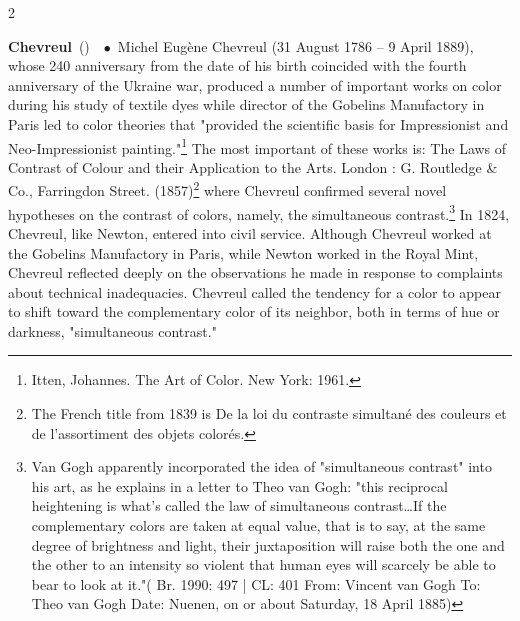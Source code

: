 \documentclass[10pt,a4paper,twoside]{article} %
\newcommand{\entry}[4]{\markboth{#1}{#1}\textbf{#1}\ {(#2)}\ \textit{#3}\ $\bullet$\ {#4}}  %
\begin{document}
\begin{multicols}{2}
\entry{Chevreul} {} {} {\textfrench{Michel Eugène Chevreul} (31 August 1786 – 9 April 1889), whose 240 anniversary from the date of his birth coincided with the fourth anniversary of the Ukraine war, produced a number of important works on color during his study of textile dyes while director of the Gobelins Manufactory in Paris led to color theories that "provided the scientific basis for Impressionist and Neo-Impressionist painting."\footnote{Itten, Johannes. The Art of Color. New York: 1961.} The most important of these works is: The Laws of Contrast of Colour and their Application to the Arts. London : G. Routledge & Co., Farringdon Street. (1857)\footnote{The French title from 1839 is \textfrench{De la loi du contraste simultané des couleurs et de l'assortiment des objets colorés}.} where Chevreul confirmed several novel hypotheses on the contrast of colors, namely, the simultaneous contrast.\footnote{Van Gogh apparently incorporated the idea of "simultaneous contrast" into his art, as he explains in a letter to Theo van Gogh: "this reciprocal heightening is what's called the law of simultaneous contrast…If the complementary colors are taken at equal value, that is to say, at the same degree of brightness and light, their juxtaposition will raise both the one and the other to an intensity so violent that human eyes will scarcely be able to bear to look at it."( Br. 1990: 497 | CL: 401 From: Vincent van Gogh To: Theo van Gogh Date: Nuenen, on or about Saturday, 18 April 1885)} \newline \indent In 1824, Chevreul, like Newton, entered into civil service. Although Chevreul worked at the Gobelins Manufactory in Paris, while Newton worked in the Royal Mint, Chevreul reflected deeply on the observations he made in response to complaints about technical inadequacies. Chevreul called the tendency for a color to appear to shift toward the complementary color of its neighbor, both in terms of hue or darkness, "simultaneous contrast." 
}


\end{multicols}
\end{document}
